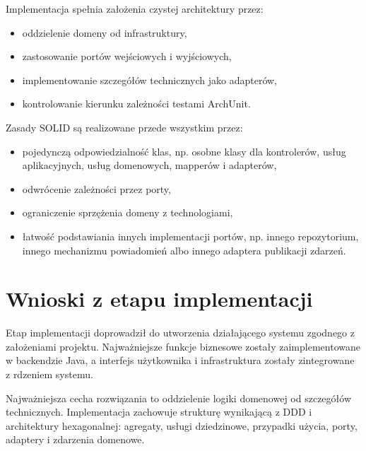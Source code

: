 Implementacja spełnia założenia czystej architektury przez:
\begin{itemize}
    \item oddzielenie domeny od infrastruktury,
    \item zastosowanie portów wejściowych i wyjściowych,
    \item implementowanie szczegółów technicznych jako adapterów,
    \item kontrolowanie kierunku zależności testami ArchUnit.
\end{itemize}

Zasady SOLID są realizowane przede wszystkim przez:
\begin{itemize}
    \item pojedynczą odpowiedzialność klas, np. osobne klasy dla kontrolerów, usług aplikacyjnych, usług domenowych, mapperów i adapterów,
    \item odwrócenie zależności przez porty,
    \item ograniczenie sprzężenia domeny z technologiami,
    \item łatwość podstawiania innych implementacji portów, np. innego repozytorium, innego mechanizmu powiadomień albo innego adaptera publikacji zdarzeń.
\end{itemize}


\section{Wnioski z etapu implementacji}

Etap implementacji doprowadził do utworzenia działającego systemu zgodnego z założeniami projektu. Najważniejsze funkcje biznesowe zostały zaimplementowane w backendzie Java, a interfejs użytkownika i infrastruktura zostały zintegrowane z rdzeniem systemu.

Najważniejsza cecha rozwiązania to oddzielenie logiki domenowej od szczegółów technicznych. Implementacja zachowuje strukturę wynikającą z DDD i architektury hexagonalnej: agregaty, usługi dziedzinowe, przypadki użycia, porty, adaptery i zdarzenia domenowe.
